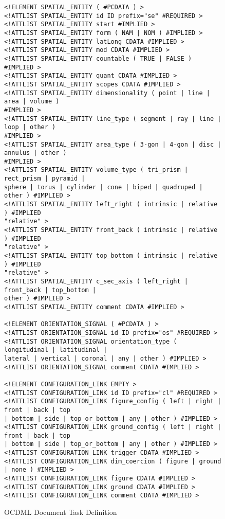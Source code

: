\documentclass[11pt]{article}
\begin{document}
\begin{appendix}
\begin{figure*}
\begin{verbatim}
<!ELEMENT SPATIAL_ENTITY ( #PCDATA ) >
<!ATTLIST SPATIAL_ENTITY id ID prefix="se" #REQUIRED >
<!ATTLIST SPATIAL_ENTITY start #IMPLIED >
<!ATTLIST SPATIAL_ENTITY form ( NAM | NOM ) #IMPLIED >
<!ATTLIST SPATIAL_ENTITY latLong CDATA #IMPLIED >
<!ATTLIST SPATIAL_ENTITY mod CDATA #IMPLIED >
<!ATTLIST SPATIAL_ENTITY countable ( TRUE | FALSE ) #IMPLIED >
<!ATTLIST SPATIAL_ENTITY quant CDATA #IMPLIED >
<!ATTLIST SPATIAL_ENTITY scopes CDATA #IMPLIED >
<!ATTLIST SPATIAL_ENTITY dimensionality ( point | line | area | volume ) 
#IMPLIED >
<!ATTLIST SPATIAL_ENTITY line_type ( segment | ray | line | loop | other ) 
#IMPLIED >
<!ATTLIST SPATIAL_ENTITY area_type ( 3-gon | 4-gon | disc | annulus | other ) 
#IMPLIED >
<!ATTLIST SPATIAL_ENTITY volume_type ( tri_prism | rect_prism | pyramid | 
sphere | torus | cylinder | cone | biped | quadruped | other ) #IMPLIED >
<!ATTLIST SPATIAL_ENTITY left_right ( intrinsic | relative ) #IMPLIED 
"relative" >
<!ATTLIST SPATIAL_ENTITY front_back ( intrinsic | relative ) #IMPLIED 
"relative" >
<!ATTLIST SPATIAL_ENTITY top_bottom ( intrinsic | relative ) #IMPLIED 
"relative" >
<!ATTLIST SPATIAL_ENTITY c_sec_axis ( left_right | front_back | top_bottom | 
other ) #IMPLIED >
<!ATTLIST SPATIAL_ENTITY comment CDATA #IMPLIED >

<!ELEMENT ORIENTATION_SIGNAL ( #PCDATA ) >
<!ATTLIST ORIENTATION_SIGNAL id ID prefix="os" #REQUIRED >
<!ATTLIST ORIENTATION_SIGNAL orientation_type ( longitudinal | latitudinal | 
lateral | vertical | coronal | any | other ) #IMPLIED >
<!ATTLIST ORIENTATION_SIGNAL comment CDATA #IMPLIED >

<!ELEMENT CONFIGURATION_LINK EMPTY >
<!ATTLIST CONFIGURATION_LINK id ID prefix="cl" #REQUIRED >
<!ATTLIST CONFIGURATION_LINK figure_config ( left | right | front | back | top 
| bottom | side | top_or_bottom | any | other ) #IMPLIED >
<!ATTLIST CONFIGURATION_LINK ground_config ( left | right | front | back | top 
| bottom | side | top_or_bottom | any | other ) #IMPLIED >
<!ATTLIST CONFIGURATION_LINK trigger CDATA #IMPLIED >
<!ATTLIST CONFIGURATION_LINK dim_coercion ( figure | ground | none ) #IMPLIED >
<!ATTLIST CONFIGURATION_LINK figure CDATA #IMPLIED >
<!ATTLIST CONFIGURATION_LINK ground CDATA #IMPLIED >
<!ATTLIST CONFIGURATION_LINK comment CDATA #IMPLIED >
        \end{verbatim}
        \caption{OCDML Document Task Definition}
        \label{fig:dtd}
    \end{figure*}
    
\end{appendix}
\end{document}
